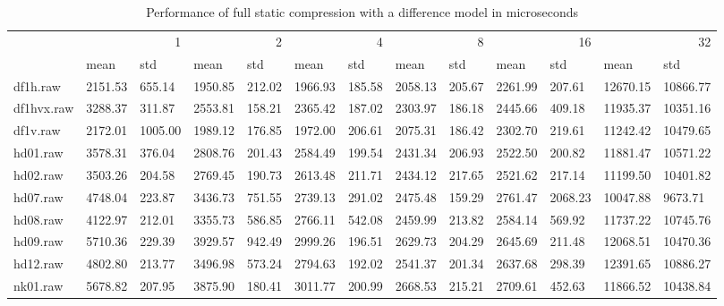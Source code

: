 \begin{table}
\caption{Performance of full static compression with a difference model in microseconds}
\begin{tabular}{lllllllllllll}
 & \multicolumn{2}{r}{1} & \multicolumn{2}{r}{2} & \multicolumn{2}{r}{4} & \multicolumn{2}{r}{8} & \multicolumn{2}{r}{16} & \multicolumn{2}{r}{32} \\
 & mean & std & mean & std & mean & std & mean & std & mean & std & mean & std \\
df1h.raw & 2151.53 & 655.14 & 1950.85 & 212.02 & 1966.93 & 185.58 & 2058.13 & 205.67 & 2261.99 & 207.61 & 12670.15 & 10866.77 \\
df1hvx.raw & 3288.37 & 311.87 & 2553.81 & 158.21 & 2365.42 & 187.02 & 2303.97 & 186.18 & 2445.66 & 409.18 & 11935.37 & 10351.16 \\
df1v.raw & 2172.01 & 1005.00 & 1989.12 & 176.85 & 1972.00 & 206.61 & 2075.31 & 186.42 & 2302.70 & 219.61 & 11242.42 & 10479.65 \\
hd01.raw & 3578.31 & 376.04 & 2808.76 & 201.43 & 2584.49 & 199.54 & 2431.34 & 206.93 & 2522.50 & 200.82 & 11881.47 & 10571.22 \\
hd02.raw & 3503.26 & 204.58 & 2769.45 & 190.73 & 2613.48 & 211.71 & 2434.12 & 217.65 & 2521.62 & 217.14 & 11199.50 & 10401.82 \\
hd07.raw & 4748.04 & 223.87 & 3436.73 & 751.55 & 2739.13 & 291.02 & 2475.48 & 159.29 & 2761.47 & 2068.23 & 10047.88 & 9673.71 \\
hd08.raw & 4122.97 & 212.01 & 3355.73 & 586.85 & 2766.11 & 542.08 & 2459.99 & 213.82 & 2584.14 & 569.92 & 11737.22 & 10745.76 \\
hd09.raw & 5710.36 & 229.39 & 3929.57 & 942.49 & 2999.26 & 196.51 & 2629.73 & 204.29 & 2645.69 & 211.48 & 12068.51 & 10470.36 \\
hd12.raw & 4802.80 & 213.77 & 3496.98 & 573.24 & 2794.63 & 192.02 & 2541.37 & 201.34 & 2637.68 & 298.39 & 12391.65 & 10886.27 \\
nk01.raw & 5678.82 & 207.95 & 3875.90 & 180.41 & 3011.77 & 200.99 & 2668.53 & 215.21 & 2709.61 & 452.63 & 11866.52 & 10438.84 \\
\end{tabular}
\end{table}
